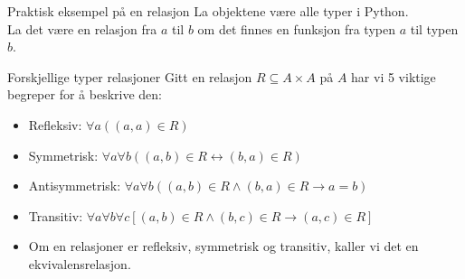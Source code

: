 \begin{frame}[fragile]{Praktisk eksempel på en relasjon}
    La objektene være alle typer i Python. \\
    La det være en relasjon fra $a$ til $b$ om det finnes en funksjon fra typen $a$ til typen $b$.\\
    
\end{frame}

\begin{frame}{Forskjellige typer relasjoner}
Gitt en relasjon $R \subseteq A \times A$ på $A$ har vi 5 viktige begreper for å beskrive den:
    \begin{itemize}
        \item Refleksiv: $\forall a ((a, a) \in R)$
        \pause
        \item Symmetrisk: $\forall a \forall b ((a, b) \in R \leftrightarrow (b, a) \in R)$
        \pause
        \item Antisymmetrisk: $\forall a \forall b ((a, b) \in R \land (b, a) \in R \rightarrow a = b)$
        \pause
        \item Transitiv: $\forall a \forall b \forall c [(a, b) \in R \land (b, c) \in R \rightarrow (a, c) \in R]$\\
        \pause
        \item Om en relasjoner er refleksiv, symmetrisk og transitiv, kaller vi det en ekvivalensrelasjon.
    \end{itemize}   
\end{frame}

